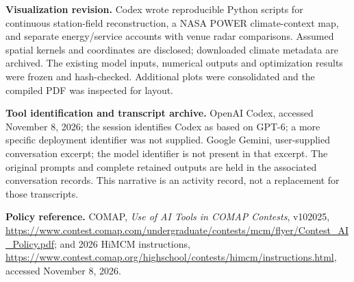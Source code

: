 \noindent\textbf{Visualization revision.} Codex wrote reproducible Python scripts for continuous station-field reconstruction, a NASA POWER climate-context map, and separate energy/service accounts with venue radar comparisons. Assumed spatial kernels and coordinates are disclosed; downloaded climate metadata are archived. The existing model inputs, numerical outputs and optimization results were frozen and hash-checked. Additional plots were consolidated and the compiled PDF was inspected for layout.

\noindent\textbf{Tool identification and transcript archive.} OpenAI Codex, accessed November 8, 2026; the session identifies Codex as based on GPT-6; a more specific deployment identifier was not supplied. Google Gemini, user-supplied conversation excerpt; the model identifier is not present in that excerpt. The original prompts and complete retained outputs are held in the associated conversation records. This narrative is an activity record, not a replacement for those transcripts.

\noindent\textbf{Policy reference.} COMAP, \emph{Use of AI Tools in COMAP Contests}, v102025, \url{https://www.contest.comap.com/undergraduate/contests/mcm/flyer/Contest_AI_Policy.pdf}; and 2026 HiMCM instructions, \url{https://www.contest.comap.org/highschool/contests/himcm/instructions.html}, accessed November 8, 2026.
